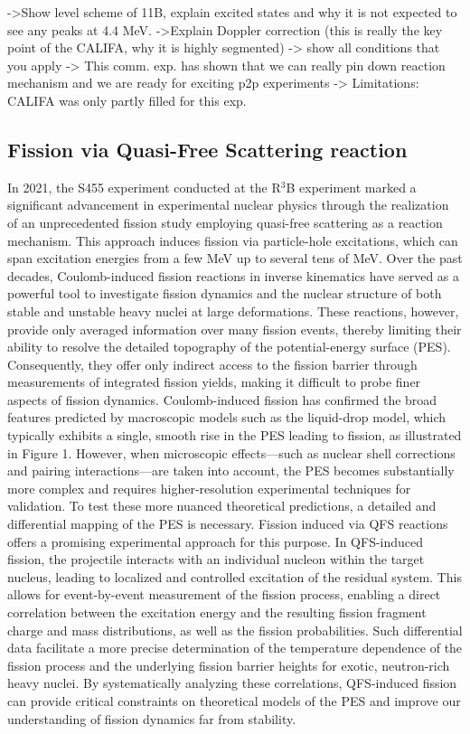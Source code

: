 ->Show level scheme of 11B, explain excited states and why it is not expected to see any peaks at 4.4 MeV.
->Explain Doppler correction (this is really the key point of the CALIFA, why it is highly segmented)
-> show all conditions that you apply
-> This comm. exp. has shown that we can really pin down reaction mechanism and we are ready for exciting p2p experiments
-> Limitations: CALIFA was only partly filled for this exp. 
\subsection{Fission via Quasi-Free Scattering reaction}
In 2021, the S455 experiment conducted at the R$^3$B experiment marked a significant advancement in experimental nuclear physics through the realization of an unprecedented fission study employing quasi-free scattering as a reaction mechanism. This approach induces fission via particle-hole excitations, which can span excitation energies from a few MeV up to several tens of MeV.\newline
Over the past decades, Coulomb-induced fission reactions in inverse kinematics have served as a powerful tool to investigate fission dynamics and the nuclear structure of both stable and unstable heavy nuclei at large deformations. These reactions, however, provide only averaged information over many fission events, thereby limiting their ability to resolve the detailed topography of the potential-energy surface (PES). Consequently, they offer only indirect access to the fission barrier through measurements of integrated fission yields, making it difficult to probe finer aspects of fission dynamics.\newline
Coulomb-induced fission has confirmed the broad features predicted by macroscopic models such as the liquid-drop model, which typically exhibits a single, smooth rise in the PES leading to fission, as illustrated in Figure 1. However, when microscopic effects—such as nuclear shell corrections and pairing interactions—are taken into account, the PES becomes substantially more complex and requires higher-resolution experimental techniques for validation.\newline
To test these more nuanced theoretical predictions, a detailed and differential mapping of the PES is necessary. Fission induced via QFS reactions offers a promising experimental approach for this purpose. In QFS-induced fission, the projectile interacts with an individual nucleon within the target nucleus, leading to localized and controlled excitation of the residual system. This allows for event-by-event measurement of the fission process, enabling a direct correlation between the excitation energy and the resulting fission fragment charge and mass distributions, as well as the fission probabilities.\newline
Such differential data facilitate a more precise determination of the temperature dependence of the fission process and the underlying fission barrier heights for exotic, neutron-rich heavy nuclei. By systematically analyzing these correlations, QFS-induced fission can provide critical constraints on theoretical models of the PES and improve our understanding of fission dynamics far from stability.


